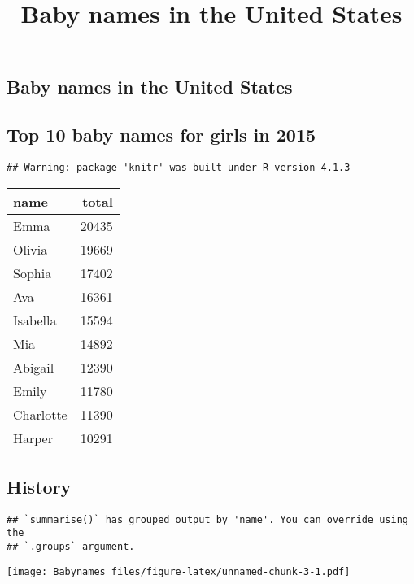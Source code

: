 \documentclass[
]{article}
\title{Baby names in the United States}
\author{}
\date{\vspace{-2.5em}}
\begin{document}
\maketitle

\hypertarget{baby-names-in-the-united-states}{%
\subsection{Baby names in the United
States}\label{baby-names-in-the-united-states}}

\hypertarget{top-10-baby-names-for-girls-in-2015}{%
\subsection{Top 10 baby names for girls in
2015}\label{top-10-baby-names-for-girls-in-2015}}

\begin{verbatim}
## Warning: package 'knitr' was built under R version 4.1.3
\end{verbatim}

\begin{longtable}[]{@{}lr@{}}
\toprule()
name & total \\
\midrule()
\endhead
Emma & 20435 \\
Olivia & 19669 \\
Sophia & 17402 \\
Ava & 16361 \\
Isabella & 15594 \\
Mia & 14892 \\
Abigail & 12390 \\
Emily & 11780 \\
Charlotte & 11390 \\
Harper & 10291 \\
\bottomrule()
\end{longtable}

\hypertarget{history}{%
\subsection{History}\label{history}}

\begin{verbatim}
## `summarise()` has grouped output by 'name'. You can override using the
## `.groups` argument.
\end{verbatim}

\texttt{[image: Babynames\_files/figure-latex/unnamed-chunk-3-1.pdf]}
\end{document}
